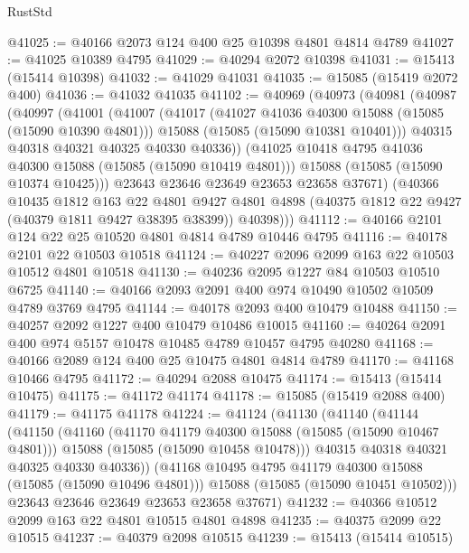 \begin{lexlean}{RustStd}
\begin{coremodule}
@41025 := @40166 @2073 @124 @400 @25 @10398 @4801 @4814 @4789
@41027 := @41025 @10389 @4795
@41029 := @40294 @2072 @10398
@41031 := @15413 (@15414 @10398)
@41032 := @41029 @41031
@41035 := @15085 (@15419 @2072 @400)
@41036 := @41032 @41035
@41102 := @40969
    (@40973
      (@40981
        (@40987
          (@40997
            (@41001
              (@41007
                (@41017
                  (@41027 @41036 @40300 @15088 (@15085 (@15090 @10390 @4801)))
                  @15088
                  (@15085 (@15090 @10381 @10401)))
                @40315
                @40318
                @40321
                @40325
                @40330
                @40336))
            (@41025 @10418 @4795 @41036 @40300 @15088 (@15085 (@15090 @10419 @4801)))
            @15088
            (@15085 (@15090 @10374 @10425)))
          @23643
          @23646
          @23649
          @23653
          @23658
          @37671)
        (@40366
          @10435
          @1812
          @163
          @22
          @4801
          @9427
          @4801
          @4898
          (@40375 @1812 @22 @9427 (@40379 @1811 @9427 @38395 @38399))
          @40398)))
@41112 := @40166 @2101 @124 @22 @25 @10520 @4801 @4814 @4789 @10446 @4795
@41116 := @40178 @2101 @22 @10503 @10518
@41124 := @40227 @2096 @2099 @163 @22 @10503 @10512 @4801 @10518
@41130 := @40236 @2095 @1227 @84 @10503 @10510 @6725
@41140 := @40166 @2093 @2091 @400 @974 @10490 @10502 @10509 @4789 @3769 @4795
@41144 := @40178 @2093 @400 @10479 @10488
@41150 := @40257 @2092 @1227 @400 @10479 @10486 @10015
@41160 := @40264 @2091 @400 @974 @5157 @10478 @10485 @4789 @10457 @4795 @40280
@41168 := @40166 @2089 @124 @400 @25 @10475 @4801 @4814 @4789
@41170 := @41168 @10466 @4795
@41172 := @40294 @2088 @10475
@41174 := @15413 (@15414 @10475)
@41175 := @41172 @41174
@41178 := @15085 (@15419 @2088 @400)
@41179 := @41175 @41178
@41224 := @41124
    (@41130
      (@41140
        (@41144
          (@41150
            (@41160
              (@41170 @41179 @40300 @15088 (@15085 (@15090 @10467 @4801)))
              @15088
              (@15085 (@15090 @10458 @10478)))
            @40315
            @40318
            @40321
            @40325
            @40330
            @40336))
        (@41168 @10495 @4795 @41179 @40300 @15088 (@15085 (@15090 @10496 @4801)))
        @15088
        (@15085 (@15090 @10451 @10502)))
      @23643
      @23646
      @23649
      @23653
      @23658
      @37671)
@41232 := @40366 @10512 @2099 @163 @22 @4801 @10515 @4801 @4898
@41235 := @40375 @2099 @22 @10515
@41237 := @40379 @2098 @10515
@41239 := @15413 (@15414 @10515)

\end{coremodule}
\end{lexlean}
